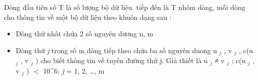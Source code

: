 Dòng đầu tiên số T là số lượng bộ dữ liệu. tiếp đến là T nhóm dòng, mỗi dòng cho thông tin về một bộ dữ liệu theo khuôn dạng sau :
\begin{itemize}
	\item Dòng thứ nhất chứa 2 số nguyên dương n, m
	\item Dòng thứ \emph{ j } trong số m dòng tiếp theo chứa ba số nguyên duong u $_ j $ , v $_ j $ , c(u $_ j $ , v $_ j $ ) cho biết thông tin về tuyến đường thứ j. Giả thiết là u $_ j $ ≠ v $_ j $ ; c(u $_ j $ , v $_ j $ ) $<$ 10^6; \emph{ j } = 1, 2, …, m
\end{itemize}